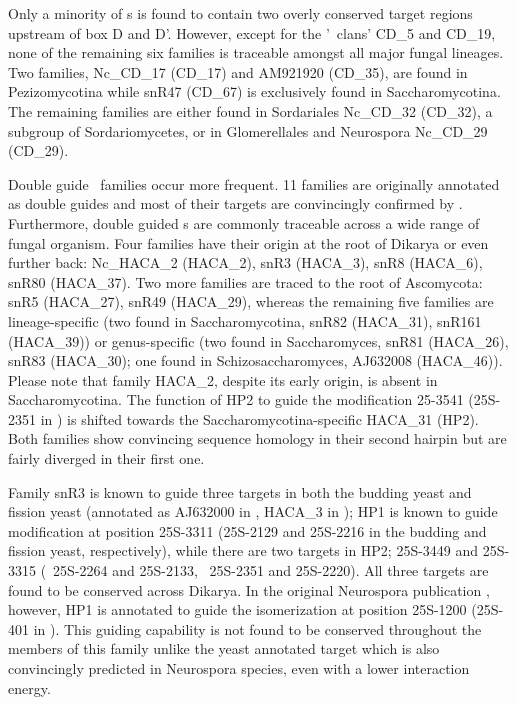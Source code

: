 Only a minority of \cd s is found to contain two overly conserved
target regions upstream of box D and D'. However, except for the '\sno\
clans' CD\_5 and CD\_19, none of the remaining six families is
traceable amongst all major fungal lineages. Two families, Nc\_CD\_17
(CD\_17) and AM921920 (CD\_35), are found in Pezizomycotina while
snR47 (CD\_67) is exclusively found in Saccharomycotina. The remaining
families are either found in Sordariales Nc\_CD\_32 (CD\_32), a
subgroup of Sordariomycetes, or in Glomerellales and Neurospora
Nc\_CD\_29 (CD\_29).

Double guide \haca\ families occur more frequent. 11 families are
originally annotated as double guides and most of their targets are
convincingly confirmed by \snostrip. Furthermore, double guided \haca
s are commonly traceable across a wide range of fungal organism. Four
families have their origin at the root of Dikarya or even further
back: Nc\_HACA\_2 (HACA\_2), snR3 (HACA\_3), snR8 (HACA\_6), snR80
(HACA\_37). Two more families are traced to the root of Ascomycota:
snR5 (HACA\_27), snR49 (HACA\_29), whereas the remaining five families
are lineage-specific (two found in Saccharomycotina, snR82 (HACA\_31),
snR161 (HACA\_39)) or genus-specific (two found in Saccharomyces,
snR81 (HACA\_26), snR83 (HACA\_30); one found in Schizosaccharomyces,
AJ632008 (HACA\_46)). Please note that family HACA\_2, despite its
early origin, is absent in Saccharomycotina. The function of HP2 to
guide the modification 25-3541 (25S-2351 in \sce) is shifted towards
the Saccharomycotina-specific HACA\_31 (HP2). Both families show
convincing sequence homology in their second hairpin but are fairly
diverged in their first one.

Family snR3 is known \cite{Schattner:2004} to guide three targets in
both the budding yeast and fission yeast (annotated as AJ632000 in
\spo, HACA\_3 in \snostrip); HP1 is known to guide modification at
position 25S-3311 (25S-2129 and 25S-2216 in the budding and fission
yeast, respectively), while there are two targets in HP2; 25S-3449 and
25S-3315 (\sce\ 25S-2264 and 25S-2133, \spo\ 25S-2351 and
25S-2220). All three targets are found to be conserved across
Dikarya. In the original Neurospora publication \cite{Liu:2009},
however, HP1 is annotated to guide the isomerization at position
25S-1200 (25S-401 in \Ncr). This guiding capability is not found to be
conserved throughout the members of this family unlike the yeast
annotated target which is also convincingly predicted in Neurospora
species, even with a lower interaction energy.

